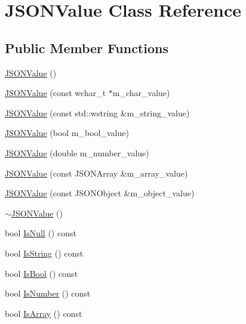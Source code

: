 \hypertarget{classJSONValue}{\section{\-J\-S\-O\-N\-Value \-Class \-Reference}
\label{classJSONValue}
}
\subsection*{\-Public \-Member \-Functions}
\begin{DoxyCompactItemize}
\item 
\hyperlink{classJSONValue_a53cb9b84540e492d5c8efb8d84906bd0}{\-J\-S\-O\-N\-Value} ()
\item 
\hyperlink{classJSONValue_ad0da2080179699cb02e133a9e041e0bd}{\-J\-S\-O\-N\-Value} (const wchar\-\_\-t $\ast$m\-\_\-char\-\_\-value)
\item 
\hyperlink{classJSONValue_a7ae87cc00a8e5ed29fb1b6f5aaaaa77a}{\-J\-S\-O\-N\-Value} (const std\-::wstring \&m\-\_\-string\-\_\-value)
\item 
\hyperlink{classJSONValue_aafcc30e3701ee1d34d54793810929518}{\-J\-S\-O\-N\-Value} (bool m\-\_\-bool\-\_\-value)
\item 
\hyperlink{classJSONValue_a07cea2c451d953c4e7767edc845cf6b1}{\-J\-S\-O\-N\-Value} (double m\-\_\-number\-\_\-value)
\item 
\hyperlink{classJSONValue_a65bd13526af5f626d0c498109dcc52aa}{\-J\-S\-O\-N\-Value} (const \-J\-S\-O\-N\-Array \&m\-\_\-array\-\_\-value)
\item 
\hyperlink{classJSONValue_a2f1580969809665bd204dca3774226f5}{\-J\-S\-O\-N\-Value} (const \-J\-S\-O\-N\-Object \&m\-\_\-object\-\_\-value)
\item 
\hyperlink{classJSONValue_ae71766eb548ae78c060f0c308ceceb4b}{$\sim$\-J\-S\-O\-N\-Value} ()
\item 
bool \hyperlink{classJSONValue_aa1f82febbed62b4736fd22659deeff46}{\-Is\-Null} () const 
\item 
bool \hyperlink{classJSONValue_ada29006af025a5959e79b373e31c5775}{\-Is\-String} () const 
\item 
bool \hyperlink{classJSONValue_af1322cab379ad85f2adf1792b843b492}{\-Is\-Bool} () const 
\item 
bool \hyperlink{classJSONValue_a37d949d2dcbe9ed9506bdaa74c2e7678}{\-Is\-Number} () const 
\item 
bool \hyperlink{classJSONValue_ab1421cbcab766cd4632b2e768a5e2d26}{\-Is\-Array} () const 
\item 

\end{DoxyCompactItemize}
